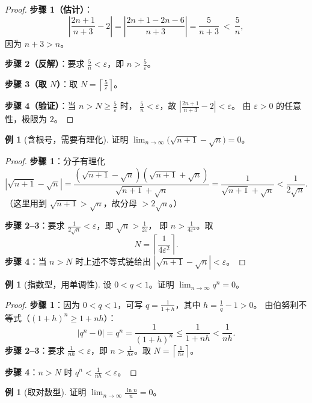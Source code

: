 \documentclass[11pt,a4paper]{ctexart}
\theoremstyle{definition}
\newtheorem{example}[theorem]{例}
\theoremstyle{remark}
\newcommand{\eps}{\varepsilon}
\newcommand{\abs}[1]{\left\lvert #1 \right\rvert}
\newcommand{\limn}{\lim_{n\to\infty}}
\begin{document}
\begin{proof}
\textbf{步骤 1（估计）}：
\[
  \abs{\frac{2n+1}{n+3}-2}
  =\abs{\frac{2n+1-2n-6}{n+3}}
  =\frac{5}{n+3}\ <\ \frac{5}{n},
\]
因为 $n+3>n$。

\textbf{步骤 2（反解）}：要求 $\frac5n<\eps$，即 $n>\frac5\eps$。

\textbf{步骤 3（取 $N$）}：取 $N=\left\lceil\frac{5}{\eps}\right\rceil$。

\textbf{步骤 4（验证）}：当 $n>N\ge\frac5\eps$ 时，
$\frac{5}{n}<\eps$，故 $\abs{\frac{2n+1}{n+3}-2}<\eps$。
由 $\eps>0$ 的任意性，极限为 $2$。

\end{proof}

\begin{example}[含根号，需要有理化]\label{ex:sqrt}
证明 $\displaystyle\limn\bigl(\sqrt{n+1}-\sqrt n\bigr)=0$。
\end{example}

\begin{proof}
\textbf{步骤 1}：分子有理化
\[
  \abs{\sqrt{n+1}-\sqrt n}
  =\frac{(\sqrt{n+1}-\sqrt n)(\sqrt{n+1}+\sqrt n)}{\sqrt{n+1}+\sqrt n}
  =\frac{1}{\sqrt{n+1}+\sqrt n}
  <\frac{1}{2\sqrt n}.
\]
（这里用到 $\sqrt{n+1}>\sqrt n$，故分母 $>2\sqrt n$。）

\textbf{步骤 2--3}：要求 $\frac{1}{2\sqrt n}<\eps$，即 $\sqrt n>\frac{1}{2\eps}$，
即 $n>\frac{1}{4\eps^{2}}$。取
\[
  N=\left\lceil\frac{1}{4\eps^{2}}\right\rceil .
\]
\textbf{步骤 4}：当 $n>N$ 时上述不等式链给出 $\abs{\sqrt{n+1}-\sqrt n}<\eps$。

\end{proof}

\begin{example}[指数型，用单调性]\label{ex:exp-seq}
设 $0<q<1$。证明 $\limn q^{n}=0$。
\end{example}

\begin{proof}
\textbf{步骤 1}：因为 $0<q<1$，可写 $q=\frac{1}{1+h}$，其中 $h=\frac1q-1>0$。
由伯努利不等式（$(1+h)^n\ge 1+nh$）：
\[
  \abs{q^{n}-0}=q^{n}=\frac{1}{(1+h)^{n}}\le\frac{1}{1+nh}<\frac{1}{nh}.
\]
\textbf{步骤 2--3}：要求 $\frac{1}{nh}<\eps$，即 $n>\frac{1}{h\eps}$。取
$N=\left\lceil\frac{1}{h\eps}\right\rceil$。

\textbf{步骤 4}：$n>N$ 时 $q^n<\frac{1}{nh}<\eps$。

\end{proof}

\begin{example}[取对数型]\label{ex:log}
证明 $\displaystyle\limn\frac{\ln n}{n}=0$。
\end{example}
\end{document}

